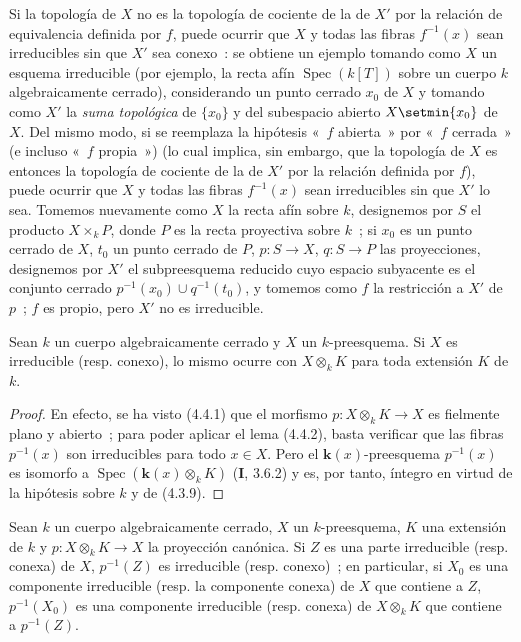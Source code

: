 \begin{remark}[4.4.3]
\label{IV.2.4.4.3-fr}
Si la topología de $X$ no es la topología de cociente de la de $X'$ por la
relación de equivalencia definida por $f$, puede ocurrir que $X$ y todas las
fibras $f^{-1}(x)$ sean irreducibles sin que $X'$ sea conexo~: se obtiene un
ejemplo tomando como $X$ un esquema irreducible (por ejemplo, la recta afín
$\operatorname{Spec}(k[T])$ sobre un cuerpo $k$ algebraicamente cerrado),
considerando un punto cerrado $x_0$ de $X$ y tomando como $X'$ la \emph{suma
topológica} de $\{x_0\}$ y del subespacio abierto $X\setmin\{x_0\}$ de $X$. Del mismo
modo, si se reemplaza la hipótesis «~$f$ abierta~» por «~$f$ cerrada~» (e
incluso «~$f$ propia~») (lo cual implica, sin embargo, que la topología de $X$
es entonces la topología de cociente de la de $X'$ por la relación definida
por $f$), puede ocurrir que $X$ y todas las fibras $f^{-1}(x)$ sean
irreducibles sin que $X'$ lo sea. Tomemos nuevamente como $X$ la recta afín
sobre $k$, designemos por $S$ el producto $X\times_k P$, donde
$P$ es la recta proyectiva sobre $k$~; si $x_0$ es un punto cerrado de
$X$, $t_0$ un punto cerrado de $P$, $p:S\to X$, $q:S\to P$ las
proyecciones, designemos por $X'$ el subpreesquema reducido cuyo espacio
subyacente es el conjunto cerrado $p^{-1}(x_0)\cup q^{-1}(t_0)$, y tomemos como
$f$ la restricción a $X'$ de $p$~; $f$ es propio, pero $X'$ no es irreducible.
\end{remark}

\begin{theorem}[4.4.4]
\label{IV.2.4.4.4-fr}
Sean $k$ un cuerpo algebraicamente cerrado y $X$ un $k$-preesquema. Si $X$ es
irreducible \textup{(resp.} conexo\textup{)}, lo mismo ocurre con $X\otimes_k K$ para toda
extensión $K$ de $k$.
\end{theorem}

\begin{proof}
En efecto, se ha visto (4.4.1) que el morfismo $p:X\otimes_k K\to X$ es
fielmente plano y abierto~; para poder aplicar el lema (4.4.2), basta verificar
que las fibras $p^{-1}(x)$ son irreducibles para todo $x\in X$. Pero el
$\boldsymbol{k}(x)$-preesquema $p^{-1}(x)$ es isomorfo a
$\operatorname{Spec}(\boldsymbol{k}(x)\otimes_k K)$ (\textbf I, 3.6.2) y es, por tanto, íntegro en
virtud de la hipótesis sobre $k$ y de (4.3.9).
\end{proof}

\begin{corollary}[4.4.5]
\label{IV.2.4.4.5-fr}
Sean $k$ un cuerpo algebraicamente cerrado, $X$ un $k$-preesquema, $K$ una
extensión de $k$ y $p:X\otimes_k K\to X$ la proyección canónica. Si $Z$ es una
parte irreducible \textup{(resp.} conexa\textup{)} de $X$, $p^{-1}(Z)$ es irreducible \textup{(resp.}
conexo\textup{)}~; en particular, si $X_0$ es una componente irreducible \textup{(resp.} la
componente conexa\textup{)} de $X$ que contiene a $Z$, $p^{-1}(X_0)$ es una componente
irreducible \textup{(resp.} conexa\textup{)} de $X\otimes_k K$ que contiene a $p^{-1}(Z)$.
\end{corollary}

